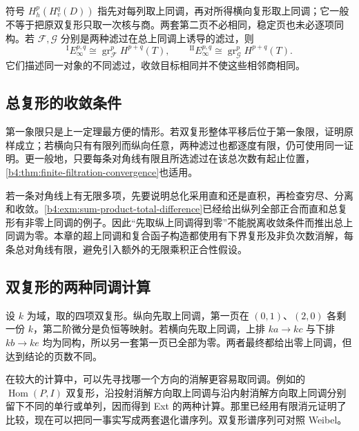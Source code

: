 符号 \(H_h^p(H_v^q(D))\) 指先对每列取上同调，再对所得横向复形取上同调；它一般不等于把原双复形只取一次核与商。两套第二页不必相同，稳定页也未必逐项同构。若 \(\mathcal F,\mathcal G\) 分别是两种滤过在总上同调上诱导的滤过，则
\[
	{}^{\mathrm I}E_\infty^{p,q}\cong\operatorname{gr}_{\mathcal F}^pH^{p+q}(T),\qquad {}^{\mathrm {II}}E_\infty^{p,q}\cong\operatorname{gr}_{\mathcal G}^pH^{p+q}(T).
\]
它们描述同一对象的不同滤过，收敛目标相同并不使这些相邻商相同。

\subsection{总复形的收敛条件}
\label{b4:subsec:1501:02}

第一象限只是上一定理最方便的情形。若双复形整体平移后位于第一象限，证明原样成立；若横向只有有限列而纵向任意，两种滤过也都逐度有限，仍可使用同一证明。更一般地，只要每条对角线有限且所选滤过在该总次数有起止位置，\cref{b4:thm:finite-filtration-convergence}也适用。

\ProseParagraphBreak
若一条对角线上有无限多项，先要说明总化采用直和还是直积，再检查穷尽、分离和收敛。\cref{b4:exm:sum-product-total-difference}已经给出纵列全部正合而直和总复形有非零上同调的例子。因此“先取纵上同调得到零”不能脱离收敛条件而推出总上同调为零。本章的超上同调和复合函子构造都使用有下界复形及非负次数消解，每条总对角线有限，避免引入额外的无限乘积正合性假设。

\subsection{双复形的两种同调计算}
\label{b4:subsec:1501:03}

\begin{example}\label{b4:exm:double-two-computations}
	设 \(k\) 为域，取的四项双复形。纵向先取上同调，第一页在 \((0,1)\)、\((2,0)\) 各剩一份 \(k\)，第二阶微分是负恒等映射。若横向先取上同调，上排 \(ka\to kc\) 与下排 \(kb\to ke\) 均为同构，所以另一套第一页已全部为零。两者最终都给出零上同调，但达到结论的页数不同。
\end{example}

在较大的计算中，可以先寻找哪一个方向的消解更容易取同调。例如的 \(\operatorname{Hom}(P,I)\) 双复形，沿投射消解方向取上同调与沿内射消解方向取上同调分别留下不同的单行或单列，因而得到 Ext 的两种计算。那里已经用有限消元证明了比较，现在可以把同一事实写成两套退化谱序列。双复形谱序列可对照 Weibel\cite[Section 5.6]{Weibel1994HomologicalAlgebra}。
